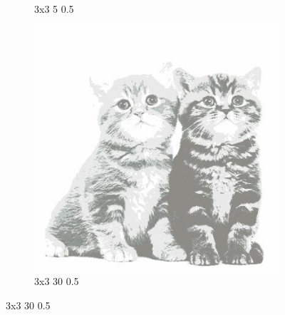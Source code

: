 \documentclass[12pt,a4paper]{article}
\begin{document}
\begin{figure}[htb]
\begin{subfigure}{0.25\textwidth}
  \caption{3x3 5 0.5}
  \label{fig:2}
\end{subfigure}\hfil %
\begin{subfigure}{0.25\textwidth}
  \includegraphics[width=\linewidth]{images/big/3-3-30-05}
  \caption{3x3 30 0.5}
  \label{fig:3}
\end{subfigure}


\end{figure}
\end{document}
